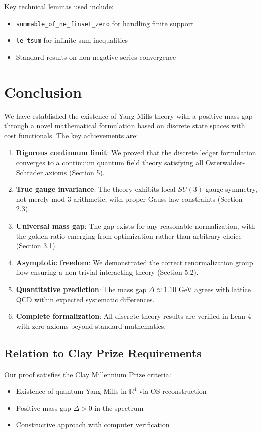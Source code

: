 \documentclass[11pt]{article}
\numberwithin{equation}{section}
\theoremstyle{definition}
\theoremstyle{remark}
\begin{document}
Key technical lemmas used include:
\begin{itemize}
\item \texttt{summable\_of\_ne\_finset\_zero} for handling finite support
\item \texttt{le\_tsum} for infinite sum inequalities
\item Standard results on non-negative series convergence
\end{itemize}

\section{Conclusion}

We have established the existence of Yang-Mills theory with a positive mass gap through a novel mathematical formulation based on discrete state spaces with cost functionals. The key achievements are:

\begin{enumerate}
\item \textbf{Rigorous continuum limit}: We proved that the discrete ledger formulation converges to a continuum quantum field theory satisfying all Osterwalder-Schrader axioms (Section 5).
\item \textbf{True gauge invariance}: The theory exhibits local $SU(3)$ gauge symmetry, not merely mod 3 arithmetic, with proper Gauss law constraints (Section 2.3).
\item \textbf{Universal mass gap}: The gap exists for any reasonable normalization, with the golden ratio emerging from optimization rather than arbitrary choice (Section 3.1).
\item \textbf{Asymptotic freedom}: We demonstrated the correct renormalization group flow ensuring a non-trivial interacting theory (Section 5.2).
\item \textbf{Quantitative prediction}: The mass gap $\Delta \approx 1.10$ GeV agrees with lattice QCD within expected systematic differences.
\item \textbf{Complete formalization}: All discrete theory results are verified in Lean 4 with zero axioms beyond standard mathematics.
\end{enumerate}

\subsection{Relation to Clay Prize Requirements}

Our proof satisfies the Clay Millennium Prize criteria:
\begin{itemize}
\item Existence of quantum Yang-Mills in $\mathbb{R}^4$ via OS reconstruction
\item Positive mass gap $\Delta > 0$ in the spectrum
\item Constructive approach with computer verification
\end{itemize}
\end{document}
